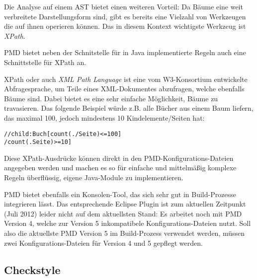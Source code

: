 Die Analyse auf einem AST bietet einen weiteren Vorteil: Da Bäume eine weit verbreitete Darstellungsform sind, gibt es bereits eine Vielzahl von Werkzeugen die auf ihnen operieren können. Das in diesem Kontext wichtigste Werkzeug ist \textit{XPath}.

PMD bietet neben der Schnitstelle für in Java implementierte Regeln auch eine Schnittstelle für XPath an.

XPath oder auch \textit{XML Path Language} ist eine vom W3-Konsortium entwickelte Abfragesprache, um Teile eines XML-Dokumentes abzufragen, welche ebenfalls Bäume sind. Dabei bietet es eine sehr einfache Möglichkeit, Bäume zu travasieren. Das folgende Beispiel würde z.B. alle Bücher aus einem Baum liefern, das maximal 100, jedoch mindestens 10 Kindelemente/Seiten hat:


\begin{lstlisting}
//child:Buch[count(./Seite)<=100]
/count(.Seite)>=10]
\end{lstlisting}

Diese XPath-Ausdrücke können direkt in den PMD-Konfigurations-Dateien angegeben werden und machen es so für einfache und mittelmäßig komplexe Regeln überflüssig, eigene Java-Module zu implementieren.

PMD bietet ebenfalls ein Konsolen-Tool, das sich sehr gut in Build-Prozesse integrieren lässt. Das entsprechende Eclipse Plugin ist zum aktuellen Zeitpunkt (Juli 2012) leider nicht auf dem aktuellsten Stand: Es arbeitet noch mit PMD Version 4, welche zur Version 5 inkompatibele Konfigurations-Dateien nutzt. Soll also die aktuellste PMD Version 5 im Build-Prozess verwendet werden, müssen zwei Konfigurations-Dateien für Version 4 und 5 gepflegt werden.


\subsection{Checkstyle}


